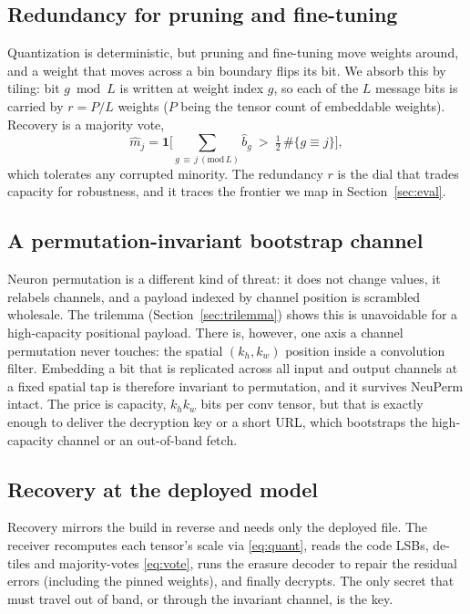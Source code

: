 \documentclass[a4paper,fleqn]{cas-dc}
\theoremstyle{plain}
\theoremstyle{remark}
\begin{document}
\subsection{Redundancy for pruning and fine-tuning}\label{sec:redund}
Quantization is deterministic, but pruning and fine-tuning move weights around, and a
weight that moves across a bin boundary flips its bit. We absorb this by tiling: bit
$g \bmod L$ is written at weight index $g$, so each of the $L$ message bits is carried
by $r=P/L$ weights ($P$ being the tensor count of embeddable weights). Recovery is a
majority vote,
\begin{equation}\label{eq:vote}
\hat m_j=\mathbf 1\!\Big[\textstyle\sum_{g\,\equiv\, j\,(\mathrm{mod}\,L)} \hat b_g
\ >\ \tfrac12\,\#\{g\equiv j\}\Big],
\end{equation}
which tolerates any corrupted minority. The redundancy $r$ is the dial that trades
capacity for robustness, and it traces the frontier we map in Section~\ref{sec:eval}.

\subsection{A permutation-invariant bootstrap channel}
Neuron permutation is a different kind of threat: it does not change values, it
relabels channels, and a payload indexed by channel position is scrambled wholesale.
The trilemma (Section~\ref{sec:trilemma}) shows this is unavoidable for a high-capacity
positional payload. There is, however, one axis a channel permutation never touches:
the spatial $(k_h,k_w)$ position inside a convolution filter. Embedding a bit that is
replicated across all input and output channels at a fixed spatial tap is therefore
invariant to permutation, and it survives NeuPerm intact. The price is capacity,
$k_h k_w$ bits per conv tensor, but that is exactly enough to deliver the decryption
key or a short URL, which bootstraps the high-capacity channel or an out-of-band fetch.

\subsection{Recovery at the deployed model}
Recovery mirrors the build in reverse and needs only the deployed file. The receiver
recomputes each tensor's scale via \eqref{eq:quant}, reads the code LSBs, de-tiles and
majority-votes \eqref{eq:vote}, runs the erasure decoder to repair the residual errors
(including the pinned weights), and finally decrypts. The only secret that must travel
out of band, or through the invariant channel, is the key.
\end{document}
